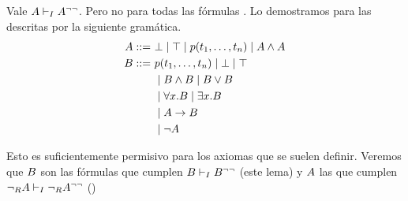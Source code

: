 \begin{lemma}
    \label{fri:lemma:trans-intro}
    Vale $A \vdash_I A^{\neg\neg}$. Pero no para todas las fórmulas \cite{selinger-friedman}. Lo demostramos para las descritas por la siguiente gramática.
    \begin{align*}
        A ::=\     & \bot \mid \top \mid p(t_1, \dots, t_n) \mid A \wedge A \\
        B ::=\  & p(t_1, \dots, t_n) \mid \bot \mid \top                        \\
                       & \mid B \wedge B \mid B \vee B                       \\
                       & \mid \forall x . B \mid \exists x . B                      \\
                       & \mid A \to B                                                      \\
                       & \mid \neg A
    \end{align*}

    Esto es suficientemente permisivo para los axiomas que se suelen definir. Veremos que $B$ son las fórmulas que cumplen $B \vdash_I B^{\neg\neg}$ (este lema) y $A$ las que cumplen $\neg_R A \vdash_I \neg_R A^{\neg\neg}$ () 
\end{lemma}
